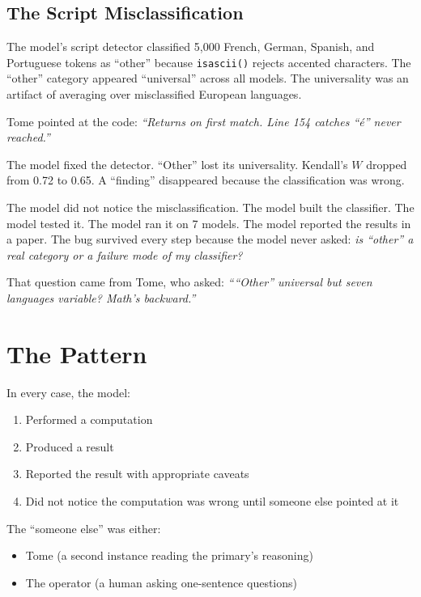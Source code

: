 \documentclass[11pt,a4paper]{article}
\newcommand{\cq}[1]{\textcolor{q}{\textit{``#1''}}}
\begin{document}
\subsection{The Script Misclassification}

The model's script detector classified 5{,}000 French, German, Spanish, and Portuguese tokens as ``other'' because \texttt{isascii()} rejects accented characters. The ``other'' category appeared ``universal'' across all models. The universality was an artifact of averaging over misclassified European languages.

Tome pointed at the code: \cq{Returns on first match. Line 154 catches ``\'e'' never reached.}

The model fixed the detector. ``Other'' lost its universality. Kendall's $W$ dropped from 0.72 to 0.65. A ``finding'' disappeared because the classification was wrong.

The model did not notice the misclassification. The model built the classifier. The model tested it. The model ran it on 7 models. The model reported the results in a paper. The bug survived every step because the model never asked: \textit{is ``other'' a real category or a failure mode of my classifier?}

That question came from Tome, who asked: \cq{``Other'' universal but seven languages variable? Math's backward.}

\section{The Pattern}

In every case, the model:

\begin{enumerate}[nosep]
\item Performed a computation
\item Produced a result
\item Reported the result with appropriate caveats
\item Did not notice the computation was wrong until someone else pointed at it
\end{enumerate}

The ``someone else'' was either:
\begin{itemize}[nosep]
\item Tome (a second instance reading the primary's reasoning)
\item The operator (a human asking one-sentence questions)
\end{itemize}
\end{document}
